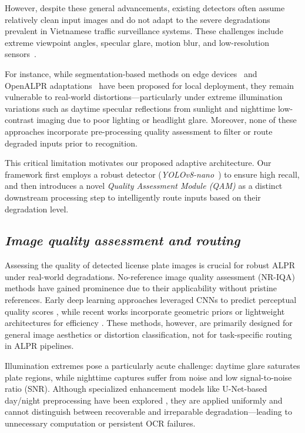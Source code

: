 \documentclass[a4paper,11pt,twocolumn]{article}
\begin{document}
	However, despite these general advancements, existing detectors often assume relatively clean input images and do not adapt to the severe degradations prevalent in Vietnamese traffic surveillance systems. These challenges include extreme viewpoint angles, specular glare, motion blur, and low-resolution sensors~\cite{TranAnh2023LicensePR}. 
	
	For instance, while segmentation-based methods on edge devices~\cite{Nguyen2025AnIO} and OpenALPR adaptations~\cite{openalpr2023} have been proposed for local deployment, they remain vulnerable to real-world distortions—particularly under extreme illumination variations such as daytime specular reflections from sunlight and nighttime low-contrast imaging due to poor lighting or headlight glare. Moreover, none of these approaches incorporate pre-processing quality assessment to filter or route degraded inputs prior to recognition. 
	
	This critical limitation motivates our proposed adaptive architecture. Our framework first employs a robust detector (\textit{YOLOv8-nano}~\cite{Yaseen2024WhatIY}) to ensure high recall, and then introduces a novel \textit{Quality Assessment Module (QAM)} as a distinct downstream processing step to intelligently route inputs based on their degradation level.
	
	\subsection{\textit{Image quality assessment and routing}}
	
	Assessing the quality of detected license plate images is crucial for robust ALPR under real-world degradations. No-reference image quality assessment (NR-IQA) methods have gained prominence due to their applicability without pristine references. Early deep learning approaches leveraged CNNs to predict perceptual quality scores \cite{simone2017,nima2018}, while recent works incorporate geometric priors \cite{shin2024} or lightweight architectures for efficiency \cite{lariqa}. These methods, however, are primarily designed for general image aesthetics or distortion classification, not for task-specific routing in ALPR pipelines.
	
	Illumination extremes pose a particularly acute challenge: daytime glare saturates plate regions, while nighttime captures suffer from noise and low signal-to-noise ratio (SNR). Although specialized enhancement models like U-Net-based day/night preprocessing have been explored \cite{Chowdhury2019ANU}, they are applied uniformly and cannot distinguish between recoverable and irreparable degradation—leading to unnecessary computation or persistent OCR failures.
	
\end{document}
